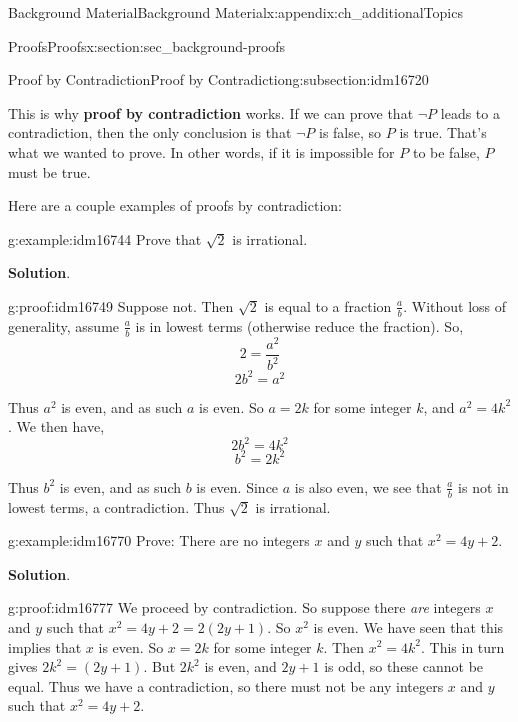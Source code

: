 \documentclass[oneside,10pt,]{book}
\newcommand{\terminology}[1]{\textbf{#1}}
\numberwithin{equation}{chapter}
\begin{document}
\begin{appendixptx}{Background Material}{}{Background Material}{}{}{x:appendix:ch_additionalTopics}
\begin{sectionptx}{Proofs}{}{Proofs}{}{}{x:section:sec_background-proofs}
\begin{subsectionptx}{Proof by Contradiction}{}{Proof by Contradiction}{}{}{g:subsection:idm16720}
\par
This is why \terminology{proof by contradiction} works. If we can prove that \(\neg P\) leads to a contradiction, then the only conclusion is that \(\neg P\) is false, so \(P\) is true. That's what we wanted to prove. In other words, if it is impossible for \(P\) to be false, \(P\) must be true.%
\par
Here are a couple examples of proofs by contradiction:%
\begin{example}{}{g:example:idm16744}%
Prove that \(\sqrt{2}\) is irrational.%
\par\smallskip%
\noindent\textbf{Solution}.\hypertarget{g:solution:idm16748}{}\quad{}\begin{proofptx}{}{g:proof:idm16749}
Suppose not. Then \(\sqrt 2\) is equal to a fraction \(\frac{a}{b}\). Without loss of generality, assume \(\frac{a}{b}\) is in lowest terms (otherwise reduce the fraction). So,%
\begin{equation*}
2 = \frac{a^2}{b^2}
\end{equation*}
%
\begin{equation*}
2b^2 = a^2
\end{equation*}
%
\par
Thus \(a^2\) is even, and as such \(a\) is even. So \(a = 2k\) for some integer \(k\), and \(a^2 = 4k^2\). We then have,%
\begin{equation*}
2b^2 = 4k^2
\end{equation*}
%
\begin{equation*}
b^2 = 2k^2
\end{equation*}
%
\par
Thus \(b^2\) is even, and as such \(b\) is even. Since \(a\) is also even, we see that \(\frac{a}{b}\) is not in lowest terms, a contradiction. Thus \(\sqrt 2\) is irrational.%
\end{proofptx}
\end{example}
\begin{example}{}{g:example:idm16770}%
Prove: There are no integers \(x\) and \(y\) such that \(x^2  = 4y + 2\).%
\par\smallskip%
\noindent\textbf{Solution}.\hypertarget{g:solution:idm16776}{}\quad{}\begin{proofptx}{}{g:proof:idm16777}
We proceed by contradiction. So suppose there \emph{are} integers \(x\) and \(y\) such that \(x^2 = 4y + 2 = 2(2y + 1)\). So \(x^2\) is even. We have seen that this implies that \(x\) is even. So \(x = 2k\) for some integer \(k\). Then \(x^2 = 4k^2\). This in turn gives \(2k^2 = (2y + 1)\). But \(2k^2\) is even, and \(2y + 1\) is odd, so these cannot be equal. Thus we have a contradiction, so there must not be any integers \(x\) and \(y\) such that \(x^2 = 4y + 2\).%

\end{proofptx}
\end{example}
\end{subsectionptx}
\end{sectionptx}
\end{appendixptx}
\end{document}
